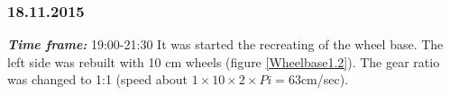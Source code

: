\subsubsection{18.11.2015}
\textit{\textbf{Time frame:}} 19:00-21:30 \newline
It was started the recreating of the wheel base. The left side was rebuilt with 10 cm wheels (figure \ref{Wheelbase1.2}). The gear ratio was changed to 1:1 (speed about $1 \times 10 \times 2 \times Pi = 63$cm/sec). 

